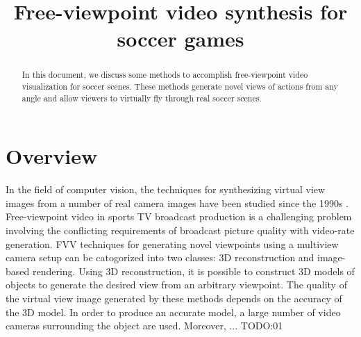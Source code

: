 \documentclass[conference]{IEEEtran}
\begin{document}
\title{Free-viewpoint video synthesis for soccer games\\
}

\author{
}

\maketitle

\begin{abstract}
In this document, we discuss some methods to accomplish free-viewpoint video visualization for soccer scenes.
These methods generate novel views of actions from any angle and allow viewers to virtually fly through real soccer scenes.
\end{abstract}




\section{Overview}
In the field of computer vision, the techniques for synthesizing virtual view images from a number of real camera
images have been studied since the 1990s \cite{b1,b2,b3}.
Free-viewpoint video in sports TV broadcast production is a challenging problem involving the conflicting requirements of 
broadcast picture quality with video-rate generation.
FVV techniques for generating novel viewpoints using a multiview camera setup can be catogorized into two classes: 
3D reconstruction and image-based rendering. Using 3D reconstruction, it is possible to construct 3D models of objects to
generate the desired view from an arbitrary viewpoint. The quality of the virtual view image generated
by these methods depends on the accuracy of the 3D model. In order to produce an accurate model, a
large number of video cameras surrounding the object are used. Moreover, ... TODO:01
\end{document}
